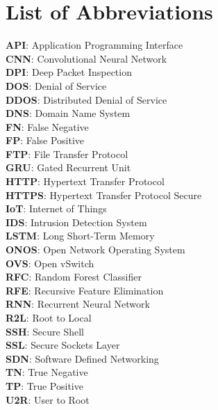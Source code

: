 \chapter*{List of Abbreviations}
\textbf{API}: Application Programming Interface\\
\textbf{CNN}: Convolutional Neural Network\\
\textbf{DPI}: Deep Packet Inspection\\
\textbf{DOS}: Denial of Service\\
\textbf{DDOS}: Distributed Denial of Service\\
\textbf{DNS}: Domain Name System\\
\textbf{FN}: False  Negative \\
\textbf{FP}: False Positive\\
\textbf{FTP}: File Transfer Protocol\\
\textbf{GRU}: Gated Recurrent Unit\\
\textbf{HTTP}: Hypertext Transfer Protocol\\
\textbf{HTTPS}: Hypertext Transfer Protocol Secure\\
\textbf{IoT}: Internet of Things\\
\textbf{IDS}: Intrusion Detection System\\
\textbf{LSTM}: Long Short-Term Memory\\
\textbf{ONOS}: Open Network Operating System\\
\textbf{OVS}: Open vSwitch\\
\textbf{RFC}: Random Forest Classifier\\
\textbf{RFE}: Recursive Feature Elimination\\
\textbf{RNN}: Recurrent Neural Network\\
\textbf{R2L}: Root to Local\\
\textbf{SSH}: Secure Shell\\
\textbf{SSL}: Secure Sockets Layer\\
\textbf{SDN}: Software Defined Networking \\
\textbf{TN}: True Negative\\
\textbf{TP}: True Positive\\
\textbf{U2R}: User to Root\\


